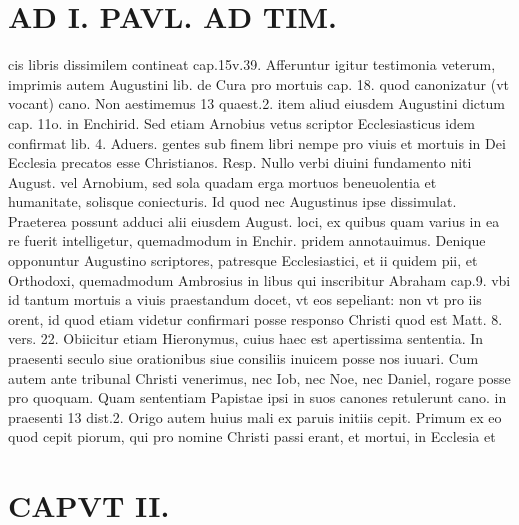 \documentclass{article}
\begin{document}
\begin{pages}
\section*{AD I. PAVL. AD TIM. }
\marginpar{[ p.46 ]}\pstart cis libris dissimilem contineat cap.15v.39. Afferuntur igitur testimonia veterum, imprimis autem Augustini lib.  de Cura pro mortuis cap. 18. quod canonizatur (vt vocant) cano. Non aestimemus 13 quaest.2. item aliud eiusdem Augustini dictum cap. 11o. in Enchirid. Sed etiam Arnobius vetus scriptor Ecclesiasticus idem confirmat lib.  4. Aduers. gentes sub finem libri nempe pro viuis et mortuis in Dei Ecclesia precatos esse Christianos. Resp. Nullo verbi diuini fundamento niti August. vel Arnobium, sed sola quadam erga mortuos beneuolentia et humanitate, solisque coniecturis. Id quod nec Augustinus ipse dissimulat. Praeterea possunt adduci alii eiusdem August. loci, ex quibus quam varius in ea re fuerit intelligetur, quemadmodum in Enchir. pridem annotauimus. Denique opponuntur Augustino scriptores, patresque Ecclesiastici, et ii quidem pii, et Orthodoxi, quemadmodum Ambrosius in libus  qui inscribitur Abraham cap.9. vbi id tantum mortuis a viuis praestandum docet, vt eos sepeliant: non vt pro iis orent, id quod etiam videtur confirmari posse responso Christi quod est Matt. 8. vers. 22. Obiicitur etiam Hieronymus, cuius haec est apertissima sententia. In praesenti seculo siue orationibus siue consiliis inuicem posse nos iuuari. Cum autem ante tribunal Christi venerimus, nec Iob, nec Noe, nec Daniel, rogare posse pro quoquam. Quam sententiam Papistae ipsi in suos canones retulerunt cano. in praesenti 13 dist.2. Origo autem huius mali ex paruis initiis cepit. Primum ex eo quod cepit piorum, qui pro nomine Christi passi erant, et mortui, in Ecclesia et  \pend
\section*{CAPVT  II. }
\marginpar{[ p.47 ]}\pstart {}
{}

\end{pages}
\end{document}
